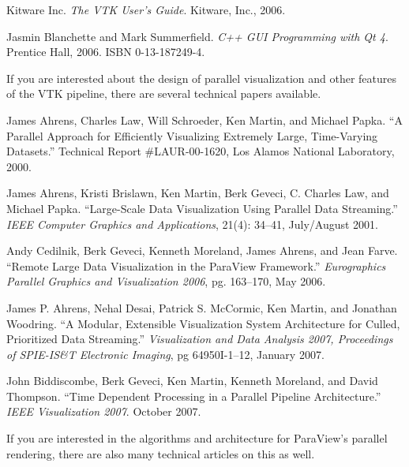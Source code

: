 \begin{reflist}
\item Kitware Inc.  \emph{The VTK User's Guide}.  Kitware, Inc., 2006.
\item Jasmin Blanchette and Mark Summerfield.  \emph{C++ GUI Programming
  with Qt 4}.  Prentice Hall, 2006.  ISBN 0-13-187249-4.
\end{reflist}

If you are interested about the design of parallel visualization and other
features of the VTK pipeline, there are several technical papers available.

\begin{reflist}
\item James Ahrens, Charles Law, Will Schroeder, Ken Martin, and Michael
  Papka.  ``A Parallel Approach for Efficiently Visualizing Extremely Large,
  Time-Varying Datasets.''  Technical Report \#LAUR-00-1620, Los Alamos
  National Laboratory, 2000.
\item James Ahrens, Kristi Brislawn, Ken Martin, Berk Geveci, C. Charles
  Law, and Michael Papka.  ``Large-Scale Data Visualization Using Parallel
  Data Streaming.''  \emph{IEEE Computer Graphics and Applications}, 21(4):
  34–41, July/August 2001.
\item Andy Cedilnik, Berk Geveci, Kenneth Moreland, James Ahrens, and Jean
  Farve.  ``Remote Large Data Visualization in the ParaView Framework.''
  \emph{Eurographics Parallel Graphics and Visualization 2006},
  pg. 163–170, May 2006.
\item James P. Ahrens, Nehal Desai, Patrick S. McCormic, Ken Martin, and
  Jonathan Woodring.  ``A Modular, Extensible Visualization System
  Architecture for Culled, Prioritized Data Streaming.''
  \emph{Visualization and Data Analysis 2007, Proceedings of SPIE-IS\&T
    Electronic Imaging}, pg 64950I-1–12, January 2007.
\item John Biddiscombe, Berk Geveci, Ken Martin, Kenneth Moreland, and
  David Thompson.  ``Time Dependent Processing in a Parallel Pipeline
  Architecture.'' \emph{IEEE Visualization 2007}.  October 2007.
\end{reflist}

If you are interested in the algorithms and architecture for ParaView's
parallel rendering, there are also many technical articles on this as well.

